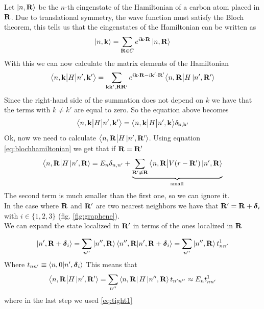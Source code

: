 Let $\ket{n,\mathbf{R}}$ be the $n$-th eingenstate of the Hamiltonian of a carbon atom placed in $\mathbf{R}$.
Due to translational symmetry, the wave function must satisfy the Bloch theorem, this tells us that the eingenstates of the Hamiltonian can be written as
\begin{equation}
    \ket{n,\mathbf{k}}=\sum_{\mathbf{R}\in C} e^{i\mathbf{k} \cdot \mathbf{R}}\ket{n,\mathbf{R}}
\end{equation}
With this we can now calculate the matrix elements of the Hamiltonian
\begin{equation}
    \big\langle n,\mathbf{k}\big|H\big| n',\mathbf{k}'\big\rangle=
    \sum_{\mathbf{k}\mathbf{k}',\mathbf{R}\mathbf{R}'}e^{i\mathbf{k}\cdot \mathbf{R}-i\mathbf{k}'\cdot\mathbf{R}'}
    \big\langle n,\mathbf{R}\big|H\ket{n',\mathbf{R}'}
\end{equation}
Since the right-hand side of the summation does not depend on $k$ we have that the terms with $k\neq k'$ are equal to zero. So the equation above becomes
\[
    \big\langle n,\mathbf{k}\big|H\big| n',\mathbf{k}'\big\rangle= \big\langle n,\mathbf{k}\big|H\big| n',\mathbf{k}\big\rangle\delta_{\mathbf{k},\mathbf{k}'}
\]
Ok, now we need to calculate $ \big\langle n,\mathbf{R}\big|H\ket{n',\mathbf{R}'}$. Using equation \ref{eq:blochhamiltonian} we get that if $\mathbf{R}=\mathbf{R}'$
\begin{equation}
    \big\langle n,\mathbf{R}\big|H\ket{n',\mathbf{R}}=E_n\delta_{n,n'}+
    \underbrace{
        \sum_{\mathbf{R}'\neq \mathbf{R}}
        \big\langle n,\mathbf{R}\big|V(r-\mathbf{R}')\ket{n',\mathbf{R}}
    }_{\text{small}}
    \label{eq:tight1}
\end{equation}
The second term is much smaller than the first one, so we can ignore it.\\
In the case where $\mathbf{R}$ and $\mathbf{R}'$ are two nearest neighbors we have that $\mathbf{R}'=\mathbf{R}+\boldsymbol\delta_i$ with $i\in \{1,2,3\}$ (fig. \ref{fig:graphene}).\\ We can expand the state localized in $\mathbf{R}'$ in terms of the ones localized in $\mathbf{R}$

\begin{equation}
    \ket{n',\mathbf{R} +\boldsymbol\delta_i}=
    \sum_{n''}\ket{n'',\mathbf{R}}\braket{n'',\mathbf{R}}{n',\mathbf{R}+\boldsymbol\delta_i}=
    \sum_{n''}\ket{n'',\mathbf{R}}t_{nn'}^1
\end{equation}
Where $t_{nn'}\equiv\braket{n,0}{n',\boldsymbol\delta_i}$
This means that 
\begin{equation}
    \big\langle n,\mathbf{R}\big|H\ket{n',\mathbf{R}'}=
    \sum_{n''}\bra{n,\mathbf{R}}H\ket{n'',\mathbf{R}}t_{n'n''}\approx
    E_n t_{nn'}^1
\end{equation}
where in the last step we used \ref{eq:tight1}
